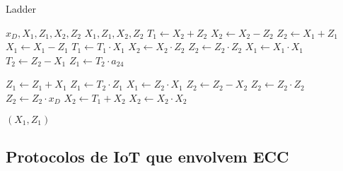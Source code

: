 \begin{algorithm}[H]
\caption{Ladder}
\begin{multicols}{2}
\begin{algorithmic} 
    \REQUIRE $x_D, X_1, Z_1, X_2, Z_2$
    \ENSURE $X_1, Z_1, X_2, Z_2$
    \STATE $T_1 \leftarrow X_2 + Z_2$
    \STATE $X_2 \leftarrow X_2 - Z_2$
    \STATE $Z_2 \leftarrow X_1 + Z_1$
    \STATE $X_1 \leftarrow X_1 - Z_1$
    \STATE $T_1 \leftarrow T_1 \cdot X_1$
    \STATE $X_2 \leftarrow X_2 \cdot Z_2$
    \STATE $Z_2 \leftarrow Z_2 \cdot Z_2$
    \STATE $X_1 \leftarrow X_1 \cdot X_1$
    \STATE $T_2 \leftarrow Z_2 - X_1$
    \STATE $Z_1 \leftarrow T_2 \cdot a_24$
    
    
    \STATE $Z_1 \leftarrow Z_1 + X_1$
    \STATE $Z_1 \leftarrow T_2 \cdot Z_1$
    \STATE $X_1 \leftarrow Z_2 \cdot X_1$
    \STATE $Z_2 \leftarrow Z_2 - X_2$
    \STATE $Z_2 \leftarrow Z_2 \cdot Z_2$
    \STATE $Z_2 \leftarrow Z_2 \cdot x_D$
    \STATE $X_2 \leftarrow T_1 + X_2$
    \STATE $X_2 \leftarrow X_2 \cdot X_2$
    
    \RETURN $(X_1,Z_1)$
\end{algorithmic}
\end{multicols}
\end{algorithm}

\subsection{Protocolos de IoT que envolvem ECC}